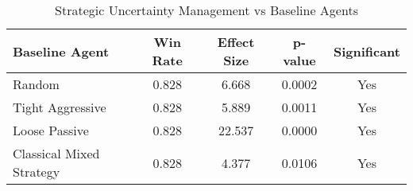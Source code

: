 \begin{table}[h]
\centering
\caption{Strategic Uncertainty Management vs Baseline Agents}
\begin{tabular}{|l|c|c|c|c|}
\hline
Baseline Agent & Win Rate & Effect Size & p-value & Significant \\
\hline
Random & 0.828 & 6.668 & 0.0002 & Yes \\
Tight Aggressive & 0.828 & 5.889 & 0.0011 & Yes \\
Loose Passive & 0.828 & 22.537 & 0.0000 & Yes \\
Classical Mixed Strategy & 0.828 & 4.377 & 0.0106 & Yes \\
\hline
\end{tabular}
\label{tab:sum_results}
\end{table}
